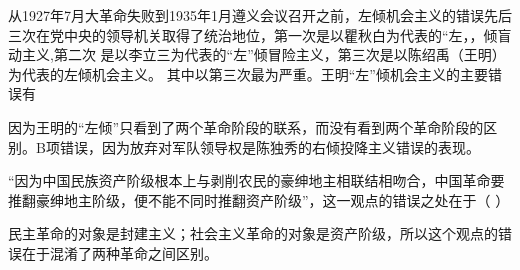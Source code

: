 \question 从1927年7月大革命失败到1935年1月遵义会议召开之前，左倾机会主义的错误先后三次在党中央的领导机关取得了统治地位，第一次是以瞿秋白为代表的``左，，倾盲动主义,第二次
是以李立三为代表的``左''倾冒险主义，第三次是以陈绍禹（王明）为代表的左倾机会主义。
其中以第三次最为严重。王明``左''倾机会主义的主要错误有
\par{}
\begin{solution}因为王明的``左倾''只看到了两个革命阶段的联系，而没有看到两个革命阶段的区别。B项错误，因为放弃对军队领导权是陈独秀的右倾投降主义错误的表现。
\end{solution}
\question ``因为中国民族资产阶级根本上与剥削农民的豪绅地主相联结相吻合，中国革命要推翻豪绅地主阶级，便不能不同时推翻资产阶级''，这一观点的错误之处在于（
）
\par{}
\begin{solution}民主革命的对象是封建主义；社会主义革命的对象是资产阶级，所以这个观点的错误在于混淆了两种革命之间区别。
\end{solution}
